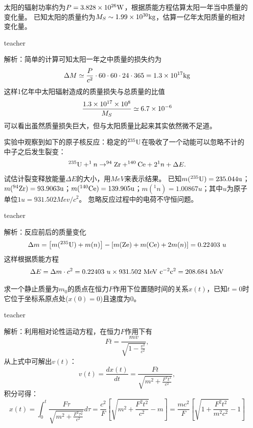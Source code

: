 \begin{example}
太阳的辐射功率约为$P = 3.828\times 10^{26}{\rm{W}}$，根据质能方程估算太阳一年当中质量的变化量。
已知太阳的质量约为$M_S\sim 1.99\times 10^{30}{\rm{kg}}$，估算一亿年太阳质量的相对变化量。
\begin{taggedblock}{teacher}
\noindent

解析：简单的计算可知太阳一年之中质量的损失约为
\[
\Delta M \simeq \frac{P}{c^2}\cdot 60\cdot 60\cdot 24\cdot 365 = 1.3\times 10^{17}{\rm{kg}}
\]
这样1亿年中太阳辐射造成的质量损失与总质量的比值
\[
\frac{1.3\times 10^{17}\times 10^{8}}{M_S}\simeq 6.7\times 10^{-6}
\]
可以看出虽然质量损失巨大，但与太阳质量比起来其实依然微不足道。
\end{taggedblock}
\end{example}


\begin{example}
实验中观察到如下的原子核反应：稳定的$^{235}{\rm U}$在吸收了一个动能可以忽略不计的中子之后发生裂变：
\[
^{235}{\rm U}+^1n\rightarrow ^{94}{\rm Zr}+^{140}{\rm Ce}+2^1n+\Delta E.
\]
试估计裂变释放能量$\Delta E$的大小，用$\unit{MeV}$来表示结果。
已知$m(^{235}{\rm U}) = 235.044{\rm{u}}$； $m(^{94}{\rm Zr}) = 93.9063{\rm{u}}$；$m(^{140}{\rm Ce}) = 139.905{\rm{u}}$；$m(^{1}n) = 1.00867\unit{u}$；其中$u$为原子单位$1u=931.502\unit{Mev/c^2}$。
忽略反应过程中的电荷不守恒问题。
\begin{taggedblock}{teacher}
\noindent

解析：反应前后的质量变化
\[
\Delta m = \left[m(^{235}{\rm U})+m(n)\right]-\left[m({\rm Ze})+m({\rm Ce})+2m(n)\right] = 0.22403~u
\]
这样根据质能方程
\[
\Delta E = \Delta m\cdot c^2 =  0.22403~u \times 931.502 ~\rm{MeV}~c^{-2} c^2 = 208.684~\rm{MeV}
\]
\end{taggedblock}
\end{example}


\begin{example}
求一个静止质量为$m_0$的质点在恒力$F$作用下位置随时间的关系$x(t)$，已知$t=0$时它位于坐标系原点处($x(0) = 0$)且速度为0。
\begin{taggedblock}{teacher}
\noindent

解析：利用相对论性运动方程，在恒力$F$作用下有
\[Ft = \frac{mv}{\sqrt{1-\frac{v^2}{c^2}}},\]
从上式中可解出$v(t)$：
\[
v(t) = \frac{dx(t)}{dt} = \frac{Ft}{\sqrt{m^2+\frac{F^2t^2}{c^2}}},
\]
积分可得：
\[
x(t) = \int_0^t\frac{F\tau}{\sqrt{m^2+\frac{F^2\tau^2}{c^2}}}d\tau = \frac{c^2}{F}\left[\sqrt{m^2+\frac{F^2t^2}{c^2}}-m\right] = \frac{mc^2}{F}\left[\sqrt{1+\frac{F^2t^2}{m^2c^2}}-1\right]
\]
\end{taggedblock}
\end{example}

